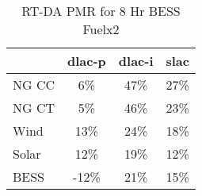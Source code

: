 \begin{table}[htbp]
\centering
\begin{tabular}{lccc}
\toprule
\hline
 & dlac-p & dlac-i & slac \\
\hline
\quad NG CC & 6\% & 47\% & 27\% \\
\quad NG CT & 5\% & 46\% & 23\% \\
\quad Wind & 13\% & 24\% & 18\% \\
\quad Solar & 12\% & 19\% & 12\% \\
\quad BESS & -12\% & 21\% & 15\% \\
\hline
\bottomrule
\end{tabular}
\caption{RT-DA PMR for 8 Hr BESS Fuelx2}
\label{tab:table4_8_Hr_BESS_Fuelx2}
\end{table}
